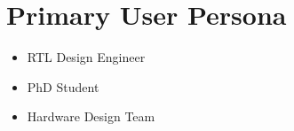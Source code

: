\section{Primary User Persona}
\begin{itemize}
\item RTL Design Engineer
\item PhD Student
\item Hardware Design Team
\end{itemize}
